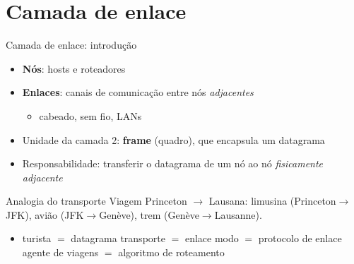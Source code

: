 \documentclass[aspectratio=169,11pt]{beamer}
\begin{document}
\section{Camada de enlace}

\begin{frame}{Camada de enlace: introdução}
  \begin{itemize}
    \item \textbf{Nós}: hosts e roteadores
    \item \textbf{Enlaces}: canais de comunicação entre nós \emph{adjacentes}
      \begin{itemize}
        \item cabeado, sem fio, LANs
      \end{itemize}
    \item Unidade da camada 2: \textbf{frame} (quadro), que encapsula um datagrama
    \item Responsabilidade: transferir o datagrama de um nó ao nó \emph{fisicamente adjacente}
  \end{itemize}
  \begin{block}{Analogia do transporte}
    Viagem Princeton $\rightarrow$ Lausana: limusina (Princeton$\rightarrow$JFK), avião (JFK$\rightarrow$Genève), trem (Genève$\rightarrow$Lausanne).
    \begin{itemize}
      \item turista $=$ datagrama \quad transporte $=$ enlace \quad modo $=$ protocolo de enlace \quad agente de viagens $=$ algoritmo de roteamento
    \end{itemize}
  \end{block}
\end{frame}
\end{document}
